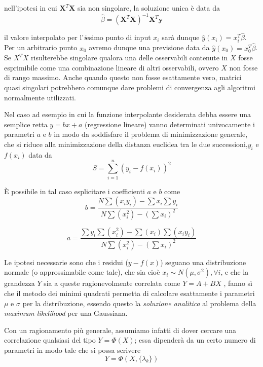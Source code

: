 \documentclass[12pt,openright,twoside,a4paper]{book}
\begin{document}
nell'ipotesi in cui $\textbf{X}^T\textbf{X}$ sia non singolare, la soluzione unica è data da
\begin{equation}
\hat{\beta}=(\textbf{X}^T\textbf{X})^{-1}\textbf{X}^T\textbf{y}
\end{equation}

il valore interpolato per l'\textit{i}esimo punto di input $x_i$ sarà dunque $\hat{y}(x_i)=x_i^T\hat{\beta}$. Per un arbitrario punto $x_0$ avremo dunque una previsione data da $\hat{y}(x_0)=x_0^T\hat{\beta}$. \cite{ESL}
Se $X^TX$ risulterebbe singolare qualora una delle osservabili contenute in $X$ fosse esprimibile come una combinazione lineare di altri osservabili, ovvero $X$ non fosse di rango massimo. Anche quando questo non fosse esattamente vero, matrici quasi singolari potrebbero comunque dare problemi di convergenza agli algoritmi normalmente utilizzati.

Nel caso ad esempio in cui la funzione interpolante desiderata debba essere una semplice retta $y=bx+a$ (regressione lineare) vanno determinati univocamente i parametri $a$ e $b$ in modo da soddisfare il problema di minimizzazione generale, che si riduce alla minimizzazione della distanza euclidea tra le due successioni,$y_i$ e $f(x_i)$ data da
\begin{equation}
 S = \sum_{i=1}^n \left(y_i - f(x_i)\right)^2
\end{equation}

È possibile in tal caso esplicitare i coefficienti $a$ e $b$ come
\begin{equation}
b=\frac{ N \sum (x_i y_i) - \sum x_i \sum y_i}{N\sum (x_i^2)-(\sum x_i)^2}
\end{equation}

\begin{equation}
a=\frac{\sum y_i \sum (x_i^2)- \sum (x_i) \sum (x_i y_i)}{N\sum (x_i^2)-(\sum x_i)^2}
\end{equation}

Le ipotesi necessarie sono che i residui ($y-f(x)$) seguano una distribuzione normale (o approssimabile come tale), che sia cioè $x_{i}\sim N(\mu,\sigma^{2}), \forall i$, e che la grandezza $Y$ sia a queste ragionevolmente correlata come $Y=A+BX$ , fanno sì che il metodo dei minimi quadrati permetta di calcolare esattamente i parametri $\mu$ e $\sigma$ per la distribuzione, essendo questo la \textit{soluzione analitica} al problema della \textit{maximum likelihood} per una Gaussiana.

Con un ragionamento più generale, assumiamo infatti di dover cercare una correlazione qualsiasi del tipo $Y=\Phi(X)$; essa dipenderà da un certo numero di parametri in modo tale che si possa scrivere
\begin{equation}
Y=\Phi(X,\{\lambda_k\})
\end{equation}
\end{document}
